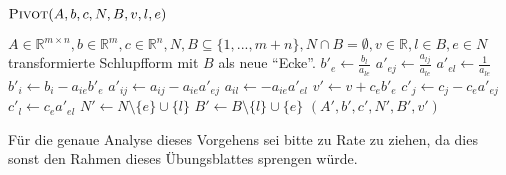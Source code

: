 \documentclass[a4paper,10pt]{article}
\begin{document}
\begin{center}
\begin{minipage}{\textwidth}
    $\textsc{Pivot}(A,b,c,N,B,v,l,e)$
    \begin{algorithmic}
        \REQUIRE $A \in \mathbb{R}^{m \times n}, b \in \mathbb{R}^{m}, c \in \mathbb{R}^{n}, N, B \subseteq \{1, ..., m{+}n\},N \cap B = \emptyset, v \in \mathbb{R}, l \in B, e \in N$
        \ENSURE transformierte Schlupfform mit $B$ als neue "`Ecke"'.
        \STATE {}
        \STATE $b'_e \gets \frac{b_l}{a_{le}}$
            \STATE $a'_{ej} \gets \frac{a_{lj}}{a_{le}}$ 
        \ENDFOR
        \STATE $a'_{el} \gets \frac{1}{a_{le}}$
            \STATE $b'_i \gets b_i - a_{ie}b'_e$
                \STATE $a'_{ij} \gets a_{ij} - a_{ie}a'_{ej}$
            \ENDFOR
            \STATE $a_{il} \gets -a_{ie}a'_{el}$
        \ENDFOR
        \STATE {}
        \STATE $v' \gets v + c_e b'_e$
            \STATE $c'_j \gets c_j - c_ea'_{ej}$
        \ENDFOR
        \STATE $c'_l \gets c_e a'_{el}$
        \STATE {}
        \STATE $N' \gets N \setminus \{e\} \cup \{l\}$
        \STATE $B' \gets B \setminus \{l\} \cup \{e\}$
        \RETURN $(A',b',c',N',B',v')$
    \end{algorithmic}
\end{minipage}
\end{center}
Für die genaue Analyse dieses Vorgehens sei bitte \cite{cormen} zu Rate zu ziehen, da dies sonst den Rahmen dieses Übungsblattes sprengen würde.
\end{document}
